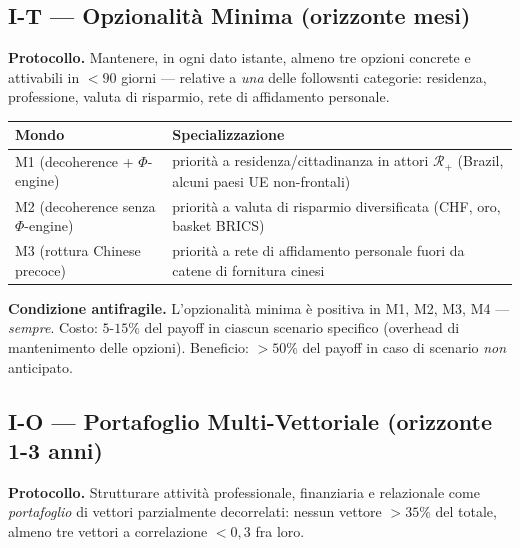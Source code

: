 \subsection{I-T --- Opzionalità Minima (orizzonte
mesi)}\label{i-t-opzionalituxe0-minima-orizzonte-mesi}

\Hypoth{} \textbf{Protocollo.} Mantenere, in ogni dato istante, almeno
tre opzioni concrete e attivabili in \(< 90\) giorni --- relative a
\emph{una} delle followsnti categorie: residenza, professione, valuta di
risparmio, rete di affidamento personale.

{\def\LTcaptype{none} %
{\small\begin{longtable}[]{@{}
  >{\raggedright\arraybackslash}p{}
  >{\raggedright\arraybackslash}p{}@{}}
\toprule\noalign{}
\begin{minipage}[b]{\linewidth}\raggedright
Mondo
\end{minipage} & \begin{minipage}[b]{\linewidth}\raggedright
Specializzazione
\end{minipage} \\
\midrule\noalign{}
\endhead
\bottomrule\noalign{}
\endlastfoot
M1 (decoherence + $\Phi$-engine) & priorità a residenza/cittadinanza in attori
\(\mathcal{R}_+\) (Brazil, alcuni paesi UE non-frontali) \\
M2 (decoherence senza $\Phi$-engine) & priorità a valuta di risparmio
diversificata (CHF, oro, basket BRICS) \\
M3 (rottura Chinese precoce) & priorità a rete di affidamento personale
fuori da catene di fornitura cinesi \\
\end{longtable}}
}

\Proved{} \textbf{Condizione antifragile.} L'opzionalità minima è
positiva in M1, M2, M3, M4 --- \emph{sempre}. Costo: \(5\)-\(15\%\) del
payoff in ciascun scenario specifico (overhead di mantenimento delle
opzioni). Beneficio: \(> 50\%\) del payoff in caso di scenario
\emph{non} anticipato.

\subsection{I-O --- Portafoglio Multi-Vettoriale (orizzonte 1-3
anni)}\label{i-o-portafoglio-multi-vettoriale-orizzonte-1-3-anni}

\Hypoth{} \textbf{Protocollo.} Strutturare attività professionale,
finanziaria e relazionale come \emph{portafoglio} di vettori
parzialmente decorrelati: nessun vettore \(> 35\%\) del totale, almeno
tre vettori a correlazione \(< 0{,}3\) fra loro.

